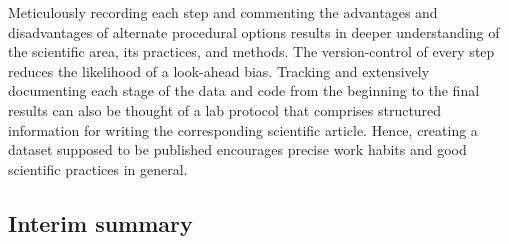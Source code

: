 Meticulously recording each step and commenting the advantages and disadvantages
of alternate procedural options results in deeper understanding of the
scientific area, its practices, and methods.
%
The version-control of every step reduces the likelihood of a look-ahead bias.
%
Tracking and extensively documenting each stage of the data and code from the
beginning to the final results can also be thought of a lab protocol that
comprises structured information for writing the corresponding scientific
article.
%
Hence, creating a dataset supposed to be published encourages precise work
habits and good scientific practices in general.


\subsection{Interim summary}




